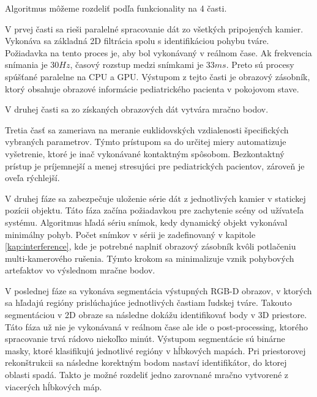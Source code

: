 \noindent Algoritmus môžeme rozdeliť podľa funkcionality na 4 časti. 

\begin{description}[leftmargin=*,labelsep=5.8mm, font=$\bullet$~\normalfont\scshape\color{black!20!black}]
	\item[Zber a príprava dát v reálnom čase]
	\item[Spracovanie a filtrácia prijatých dát]
	\item[Meranie kranio-faciálnych parametrov tváre] 
	\item[Segmentácia bodov podľa klasifikácie]
\end{description}

V prvej časti sa rieši paralelné spracovanie dát zo všetkých pripojených kamier. Vykonáva sa základná 2D filtrácia spolu s identifikáciou pohybu tváre. Požiadavka na tento proces je, aby bol vykonávaný v reálnom čase. Ak frekvencia snímania je $30Hz$, časový rozstup medzi snímkami je $33ms$. Preto sú procesy spúšťané paralelne na CPU a GPU. Výstupom z tejto časti je obrazový zásobník, ktorý obsahuje obrazové informácie pediatrického pacienta v pokojovom stave. \newline

V druhej časti sa zo získaných obrazových dát vytvára mračno bodov. 



Tretia časť sa zameriava na meranie euklidovských vzdialenosti špecifických vybraných parametrov. Týmto prístupom sa do určitej miery automatizuje vyšetrenie, ktoré je inač vykonávané kontaktným spôsobom. Bezkontaktný prístup je príjemnejší a menej stresujúci pre pediatrických pacientov, zároveň je oveľa rýchlejší.


V druhej fáze sa zabezpečuje uloženie série dát z jednotlivých kamier v statickej pozícii objektu. Táto fáza začína požiadavkou pre zachytenie scény od užívateľa systému. Algoritmus hľadá sériu snímok, kedy dynamický objekt vykonával minimálny pohyb. Počet snímkov v sérii je zadefinovaný v kapitole \ref{kap:interference}, kde je potrebné naplniť obrazový zásobník kvôli potlačeniu multi-kamerového rušenia. Týmto krokom sa minimalizuje vznik pohybových artefaktov vo výslednom mračne bodov. \newline

V poslednej fáze sa vykonáva segmentácia výstupných RGB-D obrazov, v ktorých sa hľadajú regióny prislúchajúce jednotlivých častiam ľudskej tváre. Takouto segmentáciou v 2D  obraze sa následne dokážu identifikovať body v 3D priestore. Táto fáza už nie je vykonávaná v reálnom čase ale ide o post-processing, ktorého spracovanie trvá rádovo niekoľko minút. Výstupom segmentácie sú binárne masky, ktoré klasifikujú jednotlivé regióny v hĺbkových mapách. Pri priestorovej rekonštrukcii sa následne korektným bodom nastaví identifikátor, do ktorej oblasti spadá. Takto je možné rozdeliť jedno zarovnané mračno vytvorené z viacerých hĺbkových máp.

